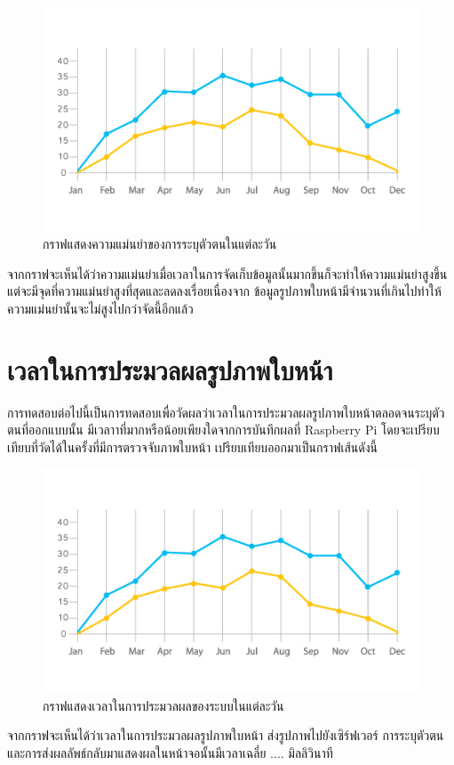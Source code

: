 \begin{figure}[!ht]
    \begin{center}
      \includegraphics[scale=.6]{pic/graph_acc.jpg}
      \caption[กราฟแสดงความแม่นยำของการระบุตัวตนในแต่ละวัน]{กราฟแสดงความแม่นยำของการระบุตัวตนในแต่ละวัน}
      \label{fig:face_graph}
    \end{center}
  \end{figure}

\indent จากกราฟจะเห็นได้ว่าความแม่นยำเมื่อเวลาในการจัดเก็บข้อมูลนั้นมากขึ้นก็จะทำให้ความแม่นยำสูงขึ้น แต่จะมีจุดที่ความแม่นยำสูงที่สุดและลดลงเรื่อยเนื่องจาก
ข้อมูลรูปภาพใบหน้ามีจำนวนที่เกินไปทำให้ความแม่นยำนั้นจะไม่สูงไปกว่าจัดนี้อีกแล้ว

\section{เวลาในการประมวลผลรูปภาพใบหน้า}
การทดสอบต่อไปนี้เป็นการทดสอบเพื่อวัดผลว่าเวลาในการประมวลผลรูปภาพใบหน้าตลอดจนระบุตัวตนที่ออกแบบนั้น
มีเวลาาที่มากหรือน้อยเพียงใดจากการบันทึกผลที่ Raspberry Pi โดยจะเปรียบเทียบที่วัดได้ในครั้งที่มีการตรวจจับภาพใบหน้า
เปรียบเทียบออกมาเป็นกราฟเส้นดังนี้
  
\begin{figure}[!ht]
  \begin{center}
    \includegraphics[scale=.7]{pic/graph_acc.jpg}
    \caption[กราฟแสดงเวลาในการประมวลผลของระบบในแต่ละวัน]{กราฟแสดงเวลาในการประมวลผลของระบบในแต่ละวัน}
    \label{fig:time_graph}
  \end{center}
\end{figure}
\newpage
\indent จากกราฟจะเห็นได้ว่าเวลาในการประมวลผลรูปภาพใบหน้า ส่งรูปภาพไปยังเซิร์ฟเวอร์ การระบุตัวตน และการส่งผลลัพธ์กลับมาแสดงผลในหน้าจอนั้นมีเวลาเฉลี่ย .... มิลลิวินาที



